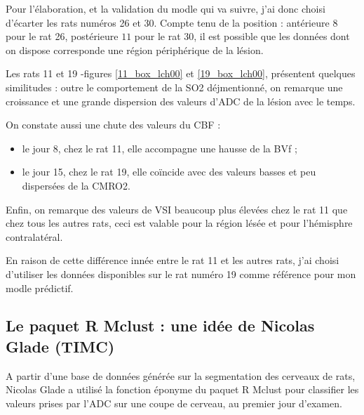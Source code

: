 \par
Pour l'\'elaboration, et la validation du modle qui va suivre, j'ai donc choisi d'\'ecarter les rats num\'eros 26 et 30. %
Compte tenu de la position : ant\'erieure  $8$ pour le rat 26, post\'erieure  $11$ pour le rat 30, %
il est possible que les donn\'ees dont on dispose corresponde  une r\'egion p\'eriph\'erique de la l\'esion.

\etoile
Les rats 11 et 19 -figures \ref{11_box_lch00} et \ref{19_box_lch00}, pr\'esentent quelques similitudes : %
outre le comportement de la SO2 d\'ejmentionn\'e, on remarque une croissance et une grande dispersion des valeurs d'ADC de la l\'esion avec le temps.

\par
On constate aussi une chute des valeurs du CBF :
\begin{itemize}
\item le jour 8, chez le rat 11, elle accompagne une hausse de la BVf ;
\item le jour 15, chez le rat 19, elle co\"incide avec des valeurs basses et peu dispers\'ees de la CMRO2.
\end{itemize}

\etoile
Enfin, on remarque des valeurs de VSI beaucoup plus \'elev\'ees chez le rat 11 que chez tous les autres rats, %
ceci est valable pour la r\'egion l\'es\'ee et pour l'h\'emisphre contralat\'eral.

\par
En raison de cette diff\'erence inn\'ee entre le rat 11 et les autres rats, %
j'ai choisi d'utiliser les donn\'ees disponibles sur le rat num\'ero 19 comme r\'ef\'erence pour mon modle pr\'edictif.

\FloatBarrier
\subsection{Le paquet R Mclust : une id\'ee de Nicolas Glade (TIMC)}%




A partir d'une base de donn\'ees g\'en\'er\'ee sur la segmentation des cerveaux de rats, Nicolas Glade a utilis\'e la fonction \'eponyme du paquet R Mclust %
pour classifier les valeurs prises par l'ADC sur une coupe de cerveau, au premier jour d'examen.

